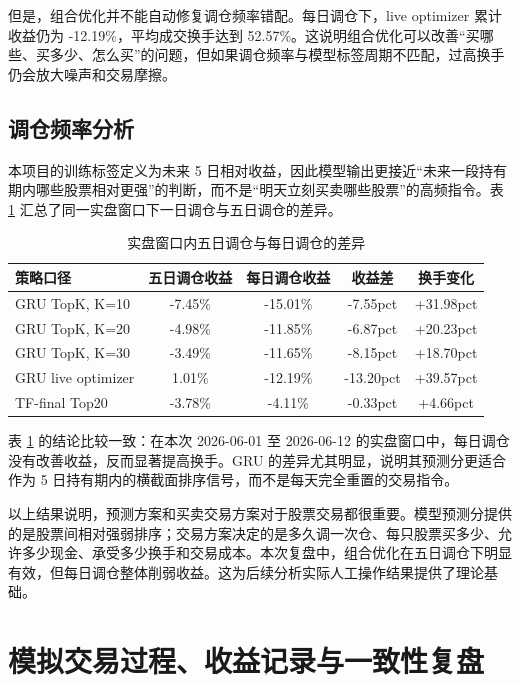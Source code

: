 \documentclass[12pt,a4paper,cn,bibtex]{elegantpaper}
\begin{document}
但是，组合优化并不能自动修复调仓频率错配。每日调仓下，live optimizer 累计收益仍为 -12.19\%，平均成交换手达到 52.57\%。这说明组合优化可以改善“买哪些、买多少、怎么买”的问题，但如果调仓频率与模型标签周期不匹配，过高换手仍会放大噪声和交易摩擦。

\subsection{调仓频率分析}

本项目的训练标签定义为未来 5 日相对收益，因此模型输出更接近“未来一段持有期内哪些股票相对更强”的判断，而不是“明天立刻买卖哪些股票”的高频指令。表 \ref{tab:rebalance-frequency} 汇总了同一实盘窗口下一日调仓与五日调仓的差异。

\begin{table}[H]
    \centering
    \small
    \setlength{\tabcolsep}{4pt}
    \begin{tabular}{lcccc}
        \toprule
        \textbf{策略口径} & \textbf{五日调仓收益} & \textbf{每日调仓收益} & \textbf{收益差} & \textbf{换手变化} \\
        \midrule
        GRU TopK, K=10 & -7.45\% & -15.01\% & -7.55pct & +31.98pct \\
        GRU TopK, K=20 & -4.98\% & -11.85\% & -6.87pct & +20.23pct \\
        GRU TopK, K=30 & -3.49\% & -11.65\% & -8.15pct & +18.70pct \\
        GRU live optimizer & 1.01\% & -12.19\% & -13.20pct & +39.57pct \\
        TF-final Top20 & -3.78\% & -4.11\% & -0.33pct & +4.66pct \\
        \bottomrule
    \end{tabular}
    \caption{实盘窗口内五日调仓与每日调仓的差异}
    \label{tab:rebalance-frequency}
\end{table}

表 \ref{tab:rebalance-frequency} 的结论比较一致：在本次 2026-06-01 至 2026-06-12 的实盘窗口中，每日调仓没有改善收益，反而显著提高换手。GRU 的差异尤其明显，说明其预测分更适合作为 5 日持有期内的横截面排序信号，而不是每天完全重置的交易指令。

以上结果说明，预测方案和买卖交易方案对于股票交易都很重要。模型预测分提供的是股票间相对强弱排序；交易方案决定的是多久调一次仓、每只股票买多少、允许多少现金、承受多少换手和交易成本。本次复盘中，组合优化在五日调仓下明显有效，但每日调仓整体削弱收益。这为后续分析实际人工操作结果提供了理论基础。

\section{模拟交易过程、收益记录与一致性复盘}
\end{document}
